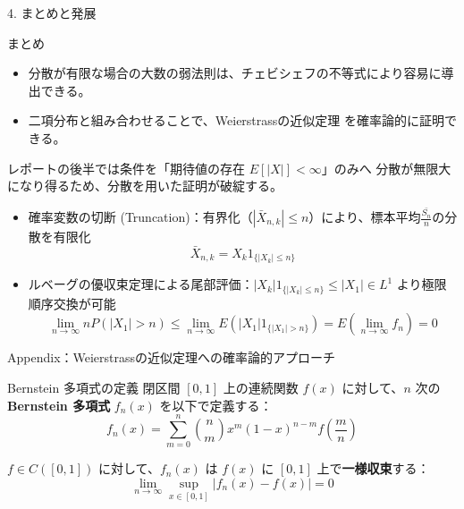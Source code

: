 \documentclass[10pt, aspectratio=169, dvipdfmx]{beamer}
\begin{document}
\begin{frame}{4. まとめと発展}
    \begin{block}{まとめ}
        \begin{itemize}
            \item 分散が有限な場合の大数の弱法則は、チェビシェフの不等式により容易に導出できる。
            \item 二項分布と組み合わせることで、Weierstrassの近似定理 を確率論的に証明できる。
        \end{itemize}
    \end{block}

    \pause
    \begin{alertblock}{レポートの後半では条件を「期待値の存在 $E[|X|] < \infty$」のみへ}
        分散が無限大になり得るため、分散を用いた証明が破綻する。
        \begin{itemize}
            \item 確率変数の切断 (Truncation)：有界化（$|\bar{X}_{n, k}| \le n$）により、標本平均$\frac{\bar{S_n}}{n}$の分散を有限化
              \[
                  \bar{X}_{n, k} = X_k 1_{\{|X_k| \le n\}}
              \]

            \item ルベーグの優収束定理による尾部評価：$|X_k| 1_{\{|X_k| \le n\}} \le |X_1| \in L^1$ より極限順序交換が可能
              \[
                  \lim_{n \to \infty} n P(|X_1| > n) \le \lim_{n \to \infty} E\left( |X_1| 1_{\{|X_1| > n\}} \right) = E\left( \lim_{n \to \infty} f_n \right) = 0
              \]
        \end{itemize}
    \end{alertblock}
\end{frame}


\begin{frame}{Appendix：Weierstrassの近似定理への確率論的アプローチ}
    \begin{exampleblock}{Bernstein 多項式の定義}
        閉区間 $[0, 1]$ 上の連続関数 $f(x)$ に対して、$n$ 次の \textbf{Bernstein 多項式} $f_n(x)$ を以下で定義する：
        \[
            f_n(x) = \sum_{m=0}^n \binom{n}{m} x^m (1-x)^{n-m} f\left(\frac{m}{n}\right)
        \]
    \end{exampleblock}

    \pause
    \begin{theorem}[Bernsteinの多項式近似定理]
        $f \in C([0, 1])$ に対して、$f_n(x)$ は $f(x)$ に $[0, 1]$ 上で\textbf{一様収束}する：
        \[
            \lim_{n \to \infty} \sup_{x \in [0, 1]} |f_n(x) - f(x)| = 0
        \]
    \end{theorem}
\end{frame}
\end{document}
